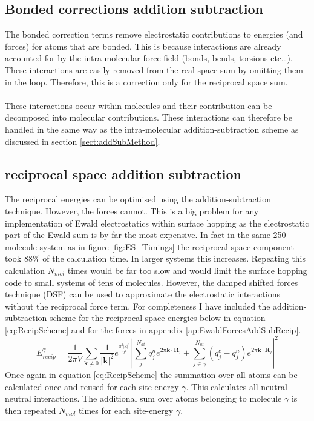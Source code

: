 \subsection{Bonded corrections addition subtraction}
The bonded correction terms remove electrostatic contributions to energies (and forces) for atoms that are bonded. This is because interactions are already accounted for by the intra-molecular force-field (bonds, bends, torsions etc\ldots). These interactions are easily removed from the real space sum by omitting them in the loop. Therefore, this is a correction only for the reciprocal space sum.
\\\\
These interactions occur within molecules and their contribution can be decomposed into molecular contributions. These interactions can therefore be handled in the same way as the intra-molecular addition-subtraction scheme as discussed in section \ref{sect:addSubMethod}.
\subsection{reciprocal space addition subtraction}
The reciprocal energies can be optimised using the addition-subtraction technique. However, the forces cannot. This is a big problem for any implementation of Ewald electrostatics within surface hopping as the electrostatic part of the Ewald sum is by far the most expensive. In fact in the same 250 molecule system as in figure \ref{fig:ES_Timings} the reciprocal space component took 88\% of the calculation time. In larger systems this increases. Repeating this calculation $N_{mol}$ times would be far too slow and would limit the surface hopping code to small systems of tens of molecules. However, the damped shifted forces technique (DSF) \cite{DSF} can be used to approximate the electrostatic interactions without the reciprocal force term. For completeness I have included the addition-subtraction scheme for the reciprocal space energies below in equation \eqref{eq:RecipScheme} and for the forces in appendix \ref{ap:EwaldForcesAddSubRecip}.
\begin{equation}
  E^{\gamma}_{recip} = \frac{1}{2 \pi V} \sum_{\mathbf{k} \neq 0} \frac{1}{|\mathbf{k}|^2} e^{\frac{\pi^2 |\mathbf{k}|^2}{\eta^2}} \left| \sum_{j}^{N_{at}} q^{n}_{j} e^{2 \pi \mathbf{k} \cdot \mathbf{R}_{j}}  + \sum_{j \in \gamma}^{N_{at}} (q^{c}_{j} - q^n_j) e^{2 \pi \mathbf{k} \cdot \mathbf{R}_{j}} \right| ^2
  \label{eq:RecipScheme}
\end{equation}
Once again in equation \eqref{eq:RecipScheme} the summation over all atoms can be calculated once and reused for each site-energy $\gamma$. This calculates all neutral-neutral interactions. The additional sum over atoms belonging to molecule $\gamma$ is then repeated $N_{mol}$ times for each site-energy $\gamma$.
